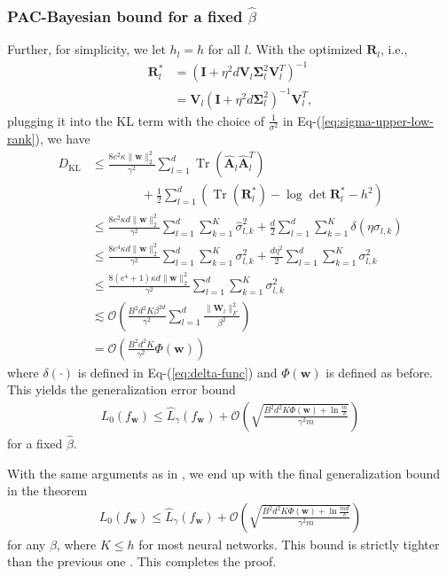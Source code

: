 \documentclass[journal]{IEEEtran} %
\def\eqref#1{Eq-(\ref{#1})}
\newcommand{\nn}{\nonumber}
\def\vw{{\bm{w}}}
\def\mA{{\bm{A}}}
\def\mI{{\bm{I}}}
\def\mR{{\bm{R}}}
\def\mV{{\bm{V}}}
\def\mW{{\bm{W}}}
\def\mSigma{{\bm{\Sigma}}}
\def\gO{{\mathcal{O}}}
\newcommand{\KL}{D_{\mathrm{KL}}}
\newcommand{\Norm}[1]{\|#1\|}
\DeclareMathOperator{\Tr}{Tr}
\begin{document}
\subsubsection{PAC-Bayesian bound for a fixed $\hat{\beta}$}
Further, for simplicity, we let $h_l=h$ for all $l$. With the optimized $\mR_l$, i.e.,
\begin{align} \label{eq:low-rank-Rl-opt}
    {\mR}_l^*  &= (\mI+\eta^2 d\mV_{l} \mSigma_{l}^2 \mV_{l}^T )^{-1} \\
    &=  \mV_{l} (\mI + \eta^2 d\mSigma_{l}^2)^{-1} \mV_{l}^T, 
\end{align}
plugging it into the KL term  with the choice of $\frac{1}{\sigma^2}$ in \eqref{eq:sigma-upper-low-rank}, we have
\begin{align}
\KL & \le \frac{8e^{2} \kappa\Norm{\vw}_2^2}{\gamma^2} \sum_{l=1}^d \Tr(\hat{\mA}_l \hat{\mA}_l^T) \nn \\
    & \qquad \qquad + \frac{1}{2} \sum_{l=1}^d \left(\Tr(\mR_l^*)  - \log \det \mR_l^* - h^2 \right)\\
    &\le \frac{8 e^2 \kappa d \Norm{\vw}_2^2}{\gamma^2 }   \sum_{l=1}^d \sum_{k=1}^K \hat{\sigma}_{l,k}^2 +\frac{d}{2} \sum_{l=1}^d \sum_{k=1}^K \delta({\eta} \sigma_{l,k})\\
    &\le \frac{8 e^4 \kappa d \Norm{\vw}_2^2}{\gamma^2 }   \sum_{l=1}^d \sum_{k=1}^K {\sigma}_{l,k}^2 +\frac{d\eta^2}{2} \sum_{l=1}^d \sum_{k=1}^K \sigma^2_{l,k}\\
    &\le \frac{8 (e^4+1) \kappa d  \Norm{\vw}_2^2 }{\gamma^2 } \sum_{l=1}^d \sum_{k=1}^K {\sigma}_{l,k}^2\\
    &\lesssim \gO\left(  \frac{B^2 d^2 K\beta^{2d}}{\gamma^2} \sum_{l=1}^d\frac{\Norm{\mW_l}_F^2}{\beta^2}\right) \\
    &=\gO\left(\frac{B^2d^2K}{\gamma^2} \Phi(\vw)\right)
\end{align}
where $\delta(\cdot)$ is defined in \eqref{eq:delta-func} and $\Phi(\vw)$ is defined as before.
This yields the generalization error bound
\begin{align}
    L_0(f_{\vw}) \le \hat{L}_{\gamma}(f_{\vw}) + \mathcal{O} \left( \sqrt{ \frac{B^2d^2K \Phi(\vw) + \ln \frac{m}{\delta}}{\gamma^2m}} \right)
\end{align}
for a fixed $\hat{\beta}$.





With the same arguments as in \cite{neyshabur2018pac}, we end up with the final generalization bound in the theorem 
\begin{align}
    L_0(f_{\vw}) \le \hat{L}_{\gamma}(f_{\vw}) + \mathcal{O} \left( \sqrt{ \frac{B^2d^2K \Phi(\vw) + \ln \frac{md}{\delta}}{\gamma^2m}} \right)
\end{align}
for any ${\beta}$, 
where $K \le h$ for most neural networks. This bound is strictly tighter than the previous one \cite{neyshabur2018pac}. This completes the proof.
\end{document}
